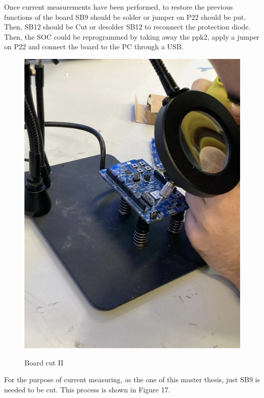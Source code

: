 \documentclass{Configuration_Files/PoliMi3i_thesis}
\begin{document}
Once current measurements have been performed, to restore the previous functions of the board SB9 should be solder or jumper on P22 should be put. Then, SB12 should be Cut or desolder SB12 to reconnect the protection diode.
Then, the SOC could be reprogrammed by taking away the ppk2, apply a jumper on P22 and connect the board to the PC through a USB.

\begin{figure}[H]
    \centering
    \includegraphics[scale=0.6]{Test_Procedure/17.png}
    \label{direct_communication_board_PC_17}
    \caption{Board cut II}
\end{figure}

For the purpose of current measuring, as the one of this master thesis, just SB9 is needed to be cut. This process is shown in Figure 17.
\end{document}

